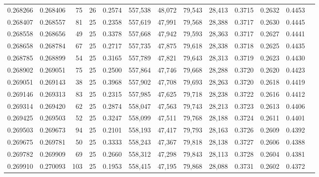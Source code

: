 \begin{tabular}{rrrrrrrrrrrrr}
0.268266 & 0.268406 &    75 &  26 &                                     0.2574 & 557,538 &  48,072 &  79,543 &  28,413 & 0.3715 & 0.2632 & 0.4453 \\
0.268407 & 0.268557 &    81 &  25 &                                     0.2358 & 557,619 &  47,991 &  79,568 &  28,388 & 0.3717 & 0.2630 & 0.4445 \\
0.268558 & 0.268656 &    49 &  25 &                                     0.3378 & 557,668 &  47,942 &  79,593 &  28,363 & 0.3717 & 0.2627 & 0.4441 \\
0.268658 & 0.268784 &    67 &  25 &                                     0.2717 & 557,735 &  47,875 &  79,618 &  28,338 & 0.3718 & 0.2625 & 0.4435 \\
0.268785 & 0.268899 &    54 &  25 &                                     0.3165 & 557,789 &  47,821 &  79,643 &  28,313 & 0.3719 & 0.2623 & 0.4430 \\
0.268902 & 0.269051 &    75 &  25 &                                     0.2500 & 557,864 &  47,746 &  79,668 &  28,288 & 0.3720 & 0.2620 & 0.4423 \\
0.269051 & 0.269143 &    38 &  25 &                                     0.3968 & 557,902 &  47,708 &  79,693 &  28,263 & 0.3720 & 0.2618 & 0.4419 \\
0.269146 & 0.269313 &    83 &  25 &                                     0.2315 & 557,985 &  47,625 &  79,718 &  28,238 & 0.3722 & 0.2616 & 0.4412 \\
0.269314 & 0.269420 &    62 &  25 &                                     0.2874 & 558,047 &  47,563 &  79,743 &  28,213 & 0.3723 & 0.2613 & 0.4406 \\
0.269425 & 0.269503 &    52 &  25 &                                     0.3247 & 558,099 &  47,511 &  79,768 &  28,188 & 0.3724 & 0.2611 & 0.4401 \\
0.269503 & 0.269673 &    94 &  25 &                                     0.2101 & 558,193 &  47,417 &  79,793 &  28,163 & 0.3726 & 0.2609 & 0.4392 \\
0.269675 & 0.269781 &    50 &  25 &                                     0.3333 & 558,243 &  47,367 &  79,818 &  28,138 & 0.3727 & 0.2606 & 0.4388 \\
0.269782 & 0.269909 &    69 &  25 &                                     0.2660 & 558,312 &  47,298 &  79,843 &  28,113 & 0.3728 & 0.2604 & 0.4381 \\
0.269910 & 0.270093 &   103 &  25 &                                     0.1953 & 558,415 &  47,195 &  79,868 &  28,088 & 0.3731 & 0.2602 & 0.4372 \\

\end{tabular}
